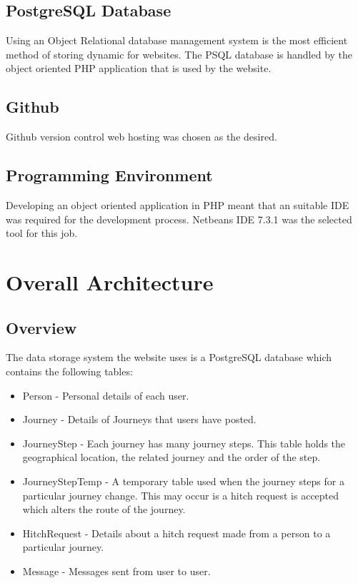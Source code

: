 	\subsection{PostgreSQL Database}
	Using an Object Relational database management system is the most efficient method of storing dynamic for websites. The PSQL database is handled by the object oriented PHP application that is used by the website.
	
	\subsection{Github}
		Github \cite{github} version control web hosting was chosen as the desired.
		
	\subsection{Programming Environment}
		Developing an object oriented application in PHP meant that an suitable IDE was required for the development process. Netbeans IDE 7.3.1 was the selected tool for this job. 
		 
\section{Overall Architecture}
	\subsection{Overview}	
		The data storage system the website uses is a PostgreSQL database which contains the following tables:
		\begin{itemize}
		\item Person - Personal details of each user.
		\item Journey - Details of Journeys that users have posted.
		\item Journey\textunderscore Step - Each journey has many journey steps. This table holds the geographical location, the related journey and the order of the step.
		\item Journey\textunderscore Step\textunderscore Temp - A temporary table used when the journey steps for a particular journey change. This may occur is a hitch request is accepted which alters the route of the journey.
		\item Hitch\textunderscore Request - Details about a hitch request made from a person to a particular journey.
		\item Message - Messages sent from user to user.
		\end{itemize}
		
